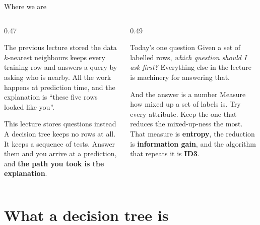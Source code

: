 \documentclass[aspectratio=169]{beamer}
\begin{document}
\begin{frame}[shrink=5]{Where we are}
  \begin{columns}[T]
    \begin{column}{0.47\textwidth}
      \begin{block}{The previous lecture stored the data}
        $k$-nearest neighbours keeps every training row and answers a query by
        asking who is nearby. All the work happens at prediction time, and the
        explanation is ``these five rows looked like you''.
      \end{block}
      \begin{block}{This lecture stores questions instead}
        A decision tree keeps no rows at all. It keeps a sequence of tests.
        Answer them and you arrive at a prediction, and \textbf{the path you
        took is the explanation}.
      \end{block}
    \end{column}
    \begin{column}{0.49\textwidth}
      \begin{exampleblock}{Today's one question}
        Given a set of labelled rows, \emph{which question should I ask
        first?} Everything else in the lecture is machinery for answering
        that.
      \end{exampleblock}
      \begin{alertblock}{And the answer is a number}
        Measure how mixed up a set of labels is. Try every attribute. Keep the
        one that reduces the mixed-up-ness the most. That measure is
        \textbf{entropy}, the reduction is \textbf{information gain}, and the
        algorithm that repeats it is \textbf{ID3}.
      \end{alertblock}
    \end{column}
  \end{columns}
\end{frame}

\section[Trees]{What a decision tree is}
\label{sec:tree}
\end{document}
